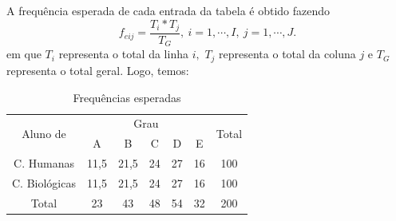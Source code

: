 \documentclass[14pt,aspectratio=1610]{beamer}
\begin{document}
\begin{frame}{}
\frametitle{}
\begin{block}{}
\justifying
A frequência esperada de cada entrada da tabela é obtido fazendo 
$$f_{eij}=\dfrac{T_{i}*T_{j}}{T_{G}},\ i=1,\cdots,I,\ j=1,\cdots, J.$$
em que $T_{i}$ representa o total da linha $i,$ $T_{j}$ representa o total da coluna $j$ e $T_{G}$ representa o total geral. Logo, temos:
\begin{table}{}
\caption{Frequências esperadas}
\begin{tabular}{c|c|c|c|c|c|c}
\multirow{2}{*}{Aluno de}&\multicolumn{5}{c}{Grau}&\multirow{2}{*}{Total}\\
\cline{2-6}
                         &A&B&C&D&E&\\
\hline
C. Humanas    &11,5& 21,5& 24& 27& 16& 100\\
C. Biológicas &11,5& 21,5& 24& 27& 16&100\\
\hline
Total         &23& 43& 48& 54& 32& 200\\
\hline
\end{tabular}
\end{table}
\end{block}
\end{frame}
\end{document}
